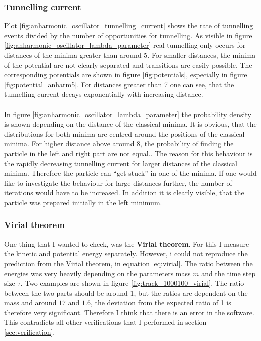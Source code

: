 \documentclass{scrartcl}
\begin{document}
	\subsubsection{Tunnelling current}
		Plot \ref{fig:anharmonic_oscillator_tunnelling_current} shows the rate of tunnelling events divided by the number of opportunities for tunnelling.
		As visible in figure \ref{fig:anharmonic_oscillator_lambda_parameter} real tunnelling only occurs for distances of the minima greater than around 5.
		For smaller distances, the minima of the potential are not clearly separated and transitions are easily possible.
		The corresponding potentials are shown in figure \ref{fig:potentials}, especially in figure \ref{fig:potential_anharm5}.
		For distances greater than 7 one can see, that the tunnelling current decays exponentially with increasing distance.
		\\
		\\
		In figure \ref{fig:anharmonic_oscillator_lambda_parameter} the probability density is shown depending on the distance of the classical minima.
		It is obvious, that the distributions for both minima are centred around the positions of the classical minima.
		For higher distance above around 8, the probability of finding the particle in the left and right part are not equal..
		The reason for this behaviour is the rapidly decreasing tunnelling current for larger distances of the classical minima.
		Therefore the particle can \enquote{get stuck} in one of the minima.
		If one would like to investigate the behaviour for large distances further, the number of iterations would have to be increased.
		In addition it is clearly visible, that the particle was prepared initially in the left minimum.

	\subsubsection{Virial theorem}
		One thing that I wanted to check, was the \textbf{Virial theorem}.
		For this I measure the kinetic and potential energy separately.
		However, i could not reproduce the prediction from the Virial theorem, in equation \ref{eq:virial}.
		The ratio between the energies was very heavily depending on the parameters mass $m$ and the time step size $\tau$.
		Two examples are shown in figure \ref{fig:track_1000100_virial}.
		The ratio between the two parts should be around 1, but the ratios are dependent on the mass and around $17$ and $1.6$, the deviation from the expected ratio of 1 is therefore very significant.
		Therefore I think that there is an error in the software.
		This contradicts all other verifications that I performed in section \ref{sec:verification}.
\end{document}
